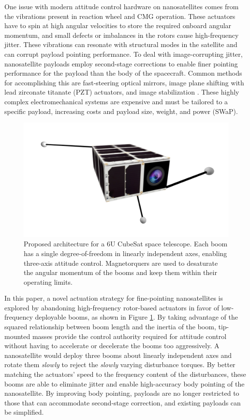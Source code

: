 One issue with modern attitude control hardware on nanosatellites comes from the vibrations present in reaction wheel and CMG operation. These actuators have to spin at high angular velocities to store the required onboard angular momentum, and small defects or imbalances in the rotors cause high-frequency jitter. These vibrations can resonate with structural modes in the satellite and can corrupt payload pointing performance. To deal with image-corrupting jitter, nanosatellite payloads employ second-stage corrections to enable finer pointing performance for the payload than the body of the spacecraft. Common methods for accomplishing this are fast-steering optical mirrors, image plane shifting with lead zirconate titanate (PZT) actuators, and image stabilization \cite{serra2021,pong,ponga,allan2018}.  
These highly complex electromechanical systems are expensive and must be tailored to a specific payload, increasing costs and payload size, weight, and power (SWaP).
\begin{figure}[t!]
    \centering
    \includegraphics[width=12cm]{Figures/view1.png}
    \caption{Proposed architecture for a 6U CubeSat space telescope. Each boom has a single degree-of-freedom in linearly independent axes, enabling three-axis attitude control. Magnetorquers are used to desaturate the angular momentum of the booms and keep them within their operating limits.}
    \label{fig:meshcat_shot}
\end{figure}

In this paper, a novel actuation strategy for fine-pointing nanosatellites is explored by abandoning high-frequency rotor-based actuators in favor of low-frequency deployable booms, as shown in Figure \ref{fig:meshcat_shot}. By taking advantage of the squared relationship between boom length and the inertia of the boom, tip-mounted masses provide the control authority required for attitude control without having to accelerate or decelerate the booms too aggressively. A nanosatellite would deploy three booms about linearly independent axes and rotate them \textit{slowly} to reject the \textit{slowly} varying disturbance torques. By better matching the actuators' speed to the frequency content of the disturbances, these booms are able to eliminate jitter and enable high-accuracy body pointing of the nanosatellite. By improving body pointing, payloads are no longer restricted to those that can accommodate second-stage correction, and existing payloads can be simplified. 

